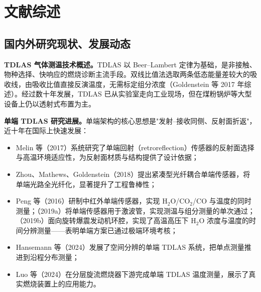 \documentclass[12pt,a4paper]{article}
\begin{document}
\section{文献综述}

\subsection{国内外研究现状、发展动态}

\textbf{TDLAS 气体测温技术概述。}TDLAS 以 Beer--Lambert 定律为基础，是非接触、物种选择、快响应的燃烧诊断主流手段。双线比值法选取两条低态能量差较大的吸收线，由吸收比值直接反演温度，无需标定组分浓度（Goldenstein 等 2017 年综述\cite{goldenstein2017}）。经过数十年发展，TDLAS 已从实验室走向工业现场，但在煤粉锅炉等大型设备上仍以透射式布置为主。

\textbf{单端 TDLAS 研究进展。}单端架构的核心思想是"发射--接收同侧、反射面折返"，近十年在国际上快速发展：
\begin{itemize}
  \item Melin 等（2017）系统研究了单端回射（retroreflection）传感器的反射面选择与高温环境适应性，为反射面材质与结构提供了设计依据\cite{melin2017}；
  \item Zhou、Mathews、Goldenstein（2018）提出紧凑型光纤耦合单端传感器，将单端光路全光纤化，显著提升了工程鲁棒性\cite{zhou2018}；
  \item Peng 等（2016）研制中红外单端传感器，实现 H$_2$O/CO$_2$/CO 与温度的同时测量\cite{peng2016}；（2019a）将单端传感器用于激波管，实现测温与组分测量的单次通过\cite{peng2019a}；（2019b）面向旋转爆震发动机环腔，实现了高温高压下 H$_2$O 浓度与温度的时间分辨测量\cite{peng2019b}——表明单端方案已通过极端环境考核；
  \item Hansemann 等（2024）发展了空间分辨的单端 TDLAS 系统，把单点测量推进到沿程分布测量\cite{hansemann2024}；
  \item Luo 等（2024）在分层旋流燃烧器下游完成单端 TDLAS 温度测量，展示了真实燃烧装置上的应用能力\cite{luo2024}。
\end{itemize}
\end{document}

